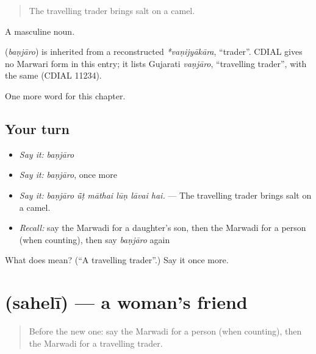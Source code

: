 \begin{quote}
The travelling trader brings salt on a camel.
\end{quote}

A masculine noun.

\begin{cousinweb}
\textbf{} (\emph{baṇjāro}) is inherited from a reconstructed \emph{*vaṇijyākāra}, \textquotedblleft{}trader\textquotedblright{}. CDIAL gives no Marwari form in this entry; it lists Gujarati \emph{vaṇjāro}, \textquotedblleft{}travelling trader\textquotedblright{}, with the same  (CDIAL 11234).
\end{cousinweb}

\begin{grammarlens}[title={What you've built}]
One more word for this chapter.
\end{grammarlens}

\subsection*{Your turn}
\begin{itemize}
\raggedright
  \item \emph{Say it:} \emph{baṇjāro}
  \item \emph{Say it:} \emph{baṇjāro}, once more
  \item \emph{Say it:} \emph{baṇjāro ū̃ṭ māthai lūṇ lāvai hai.} — The travelling trader brings salt on a camel.
  \item \emph{Recall:} say the Marwadi for a daughter's son, then the Marwadi for a person (when counting), then say \emph{baṇjāro} again
\end{itemize}

\begin{tcolorbox}[breakable,colback=teal!4,colframe=teal!35!black,title={Before you move on}]
What does  mean? (\textquotedblleft{}A travelling trader\textquotedblright{}.) Say it once more.
\end{tcolorbox}
\section[\texorpdfstring{\mw{सहेली} (sahelī)}{सहेली (sahelī)}]{ (sahelī) — a woman's friend}

\label{lesson:MW-C262-saheli}



\begin{quote}
Before the new one: say the Marwadi for a person (when counting), then the Marwadi for a travelling trader.
\end{quote}

